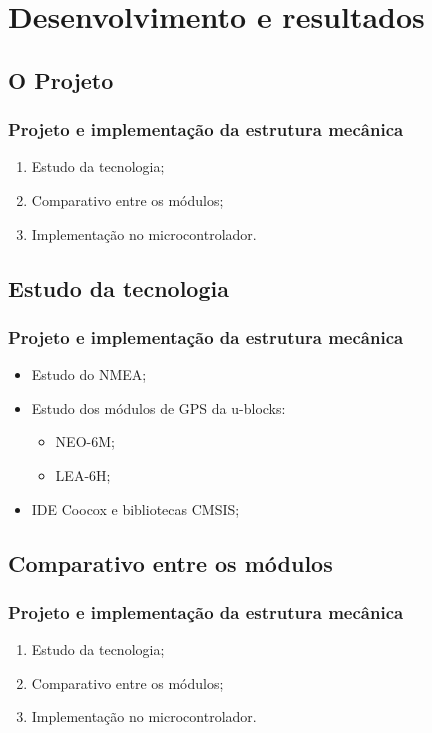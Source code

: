 \section{Desenvolvimento e resultados}


\subsection{O Projeto}

\begin{frame}
\frametitle{Projeto e implementação da estrutura mecânica}
\begin{enumerate}
\item Estudo da tecnologia;
\pause \item Comparativo entre os módulos;
\pause \item Implementação no microcontrolador.
\end{enumerate}
\end{frame}

\subsection{Estudo da tecnologia}

\begin{frame}
\frametitle{Projeto e implementação da estrutura mecânica}
\begin{itemize}
\item Estudo do NMEA;
\pause
\item Estudo dos módulos de GPS da u-blocks:
	\begin{itemize}
	\item NEO-6M;
	\item LEA-6H;
	\end{itemize}
\pause
\item IDE Coocox e bibliotecas CMSIS;
\end{itemize}
\end{frame}

\subsection{Comparativo entre os módulos}

\begin{frame}
\frametitle{Projeto e implementação da estrutura mecânica}
\begin{enumerate}
\item Estudo da tecnologia;
\pause \item Comparativo entre os módulos;
\pause \item Implementação no microcontrolador.
\end{enumerate}
\end{frame}

